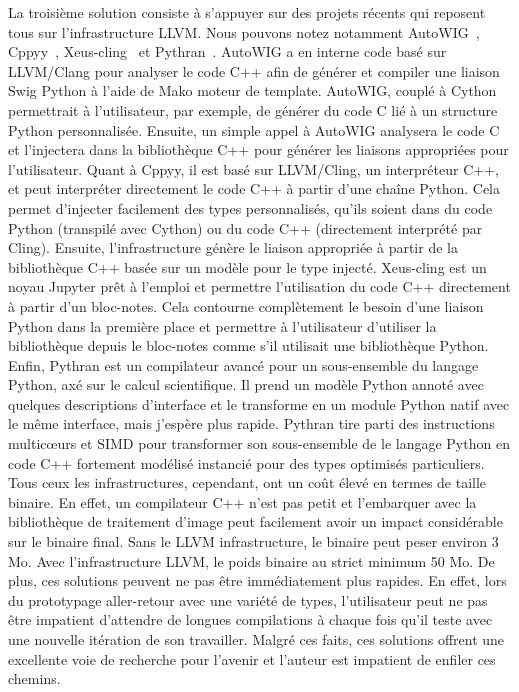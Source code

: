 La troisième solution consiste à s'appuyer sur des projets récents qui reposent tous sur l'infrastructure LLVM. Nous
pouvons notez notamment AutoWIG~\parencite{fernique.2018.autowig}, Cppyy~\parencite{wimtlplavrijsen.2016.cppyy},
Xeus-cling~\parencite{quantstack.2021.xeus-cling} et Pythran~\parencite{guelton.2015.pythran}. AutoWIG a en interne code
basé sur LLVM/Clang pour analyser le code C++ afin de générer et compiler une liaison Swig Python à l'aide de Mako
moteur de template. AutoWIG, couplé à Cython permettrait à l'utilisateur, par exemple, de générer du code C lié à un
structure Python personnalisée. Ensuite, un simple appel à AutoWIG analysera le code C et l'injectera dans la
bibliothèque C++ pour générer les liaisons appropriées pour l'utilisateur. Quant à Cppyy, il est basé sur LLVM/Cling, un
interpréteur C++, et peut interpréter directement le code C++ à partir d'une chaîne Python. Cela permet d'injecter
facilement des types personnalisés, qu'ils soient dans du code Python (transpilé avec Cython) ou du code C++
(directement interprété par Cling). Ensuite, l'infrastructure génère le liaison appropriée à partir de la bibliothèque
C++ basée sur un modèle pour le type injecté. Xeus-cling est un noyau Jupyter prêt à l'emploi et permettre l'utilisation
du code C++ directement à partir d'un bloc-notes. Cela contourne complètement le besoin d'une liaison Python dans la
première place et permettre à l'utilisateur d'utiliser la bibliothèque depuis le bloc-notes comme s'il utilisait une
bibliothèque Python. Enfin, Pythran est un compilateur avancé pour un sous-ensemble du langage Python, axé sur le calcul
scientifique. Il prend un modèle Python annoté avec quelques descriptions d'interface et le transforme en un module
Python natif avec le même interface, mais j'espère plus rapide. Pythran tire parti des instructions multicœurs et SIMD
pour transformer son sous-ensemble de le langage Python en code C++ fortement modélisé instancié pour des types
optimisés particuliers. Tous ceux les infrastructures, cependant, ont un coût élevé en termes de taille binaire. En
effet, un compilateur C++ n'est pas petit et l'embarquer avec la bibliothèque de traitement d'image peut facilement
avoir un impact considérable sur le binaire final. Sans le LLVM infrastructure, le binaire peut peser environ 3 Mo. Avec
l'infrastructure LLVM, le poids binaire au strict minimum 50 Mo. De plus, ces solutions peuvent ne pas être
immédiatement plus rapides. En effet, lors du prototypage aller-retour avec une variété de types, l'utilisateur peut ne
pas être impatient d'attendre de longues compilations à chaque fois qu'il teste avec une nouvelle itération de son
travailler. Malgré ces faits, ces solutions offrent une excellente voie de recherche pour l'avenir et l'auteur est
impatient de enfiler ces chemins.


